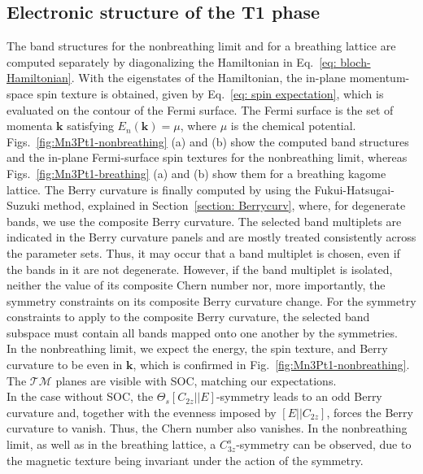 \subsection{Electronic structure of the T1 phase}
\label{subsubsection: T1 phase}
The band structures for the nonbreathing limit and for a breathing lattice are computed separately by diagonalizing the Hamiltonian in Eq.~\eqref{eq: bloch-Hamiltonian}. With the eigenstates of the Hamiltonian, the in-plane momentum-space spin texture is obtained, given by Eq.~\eqref{eq: spin expectation}, which is evaluated on the contour of the Fermi surface. The Fermi surface is the set of momenta $\mathbf{k}$ satisfying $E_n(\mathbf{k})=\mu$, where $\mu$ is the chemical potential.
Figs.~\ref{fig:Mn3Pt1-nonbreathing} (a) and (b) show the computed band structures and the in-plane Fermi-surface spin textures for the nonbreathing limit, whereas Figs.~\ref{fig:Mn3Pt1-breathing} (a) and (b) show them for a breathing kagome lattice. 
The Berry curvature is finally computed by using the Fukui-Hatsugai-Suzuki method, explained in Section~\ref{section: Berrycurv}, where, for degenerate bands, we use the composite Berry curvature. The selected band multiplets are indicated in the Berry curvature panels and are mostly treated consistently across the parameter sets. Thus, it may occur that a band multiplet is chosen, even if the bands in it are not degenerate. However, if the band multiplet is isolated, neither the value of its composite Chern number nor, more importantly, the symmetry constraints on its composite Berry curvature change. For the symmetry constraints to apply to the composite Berry curvature, the selected band subspace must contain all bands mapped onto one another by the symmetries.\\

In the nonbreathing limit, we expect the energy, the spin texture, and Berry curvature to be even in $\mathbf{k}$, which is confirmed in Fig.~\ref{fig:Mn3Pt1-nonbreathing}. 
The $\mathcal{TM}$ planes are visible with SOC, matching our expectations. 
\\
In the case without SOC, the $\Theta_s[C_{2z}||E]$-symmetry leads to an odd Berry curvature and, together with the evenness imposed by $[E||C_{2z}]$, forces the Berry curvature to vanish. Thus, the Chern number also vanishes. 
In the nonbreathing limit, as well as in the breathing lattice, a $C_{3z}^s$-symmetry can be observed, due to the magnetic texture being invariant under the action of the symmetry.

